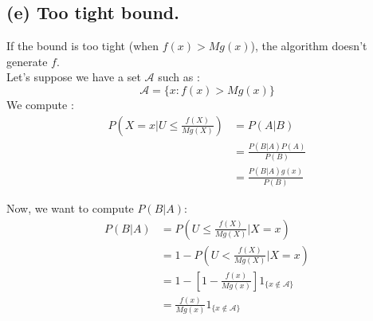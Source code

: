 \documentclass{article}
\begin{document}
\subsection*{(e) Too tight bound.}
If the bound is too tight (when $f(x)> Mg(x)$), the algorithm doesn't generate 
$f$. \\ 
Let's suppose we have a set $\mathcal{A}$ such as :
\[
\mathcal{A} = \{x : f(x)> Mg(x) \}\]
We compute : 
\begin{align*}
    P \left (  X = x | U \leq \frac{f(X)}{Mg(X)} \right ) &= P(A|B) \\
        &= \frac{P(B|A)P(A)}{P(B)}     \\ 
        &=\frac{P(B|A)g(x)}{P(B)}
\end{align*}

Now, we want to compute $P(B|A)$:
\begin{align*}
    P(B|A) &= P \left (  U \leq \frac{f(X)}{Mg(X)}  |  X = x \right) \\
        &= 1 - P \left (  U < \frac{f(X)}{Mg(X)}  |  X = x \right) \\
        &= 1- \left [ 
                1- \frac{f(x)}{Mg(x)}
            \right ] 1_{\{x \notin \mathcal{A}\} } \\
        & =  \frac{f(x)}{Mg(x)}1_{\{x \notin \mathcal{A}\} }
\end{align*}
\end{document}
